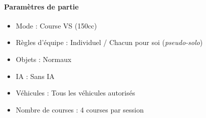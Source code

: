\documentclass[11pt,a4paper]{article}
\begin{document}
    \paragraph{Paramètres de partie}
    \begin{itemize}
        \item Mode : Course VS (150cc)
        \item Règles d'équipe : Individuel / Chacun pour soi (\textit{pseudo-solo})
        \item Objets : Normaux
        \item IA : Sans IA
        \item Véhicules : Tous les véhicules autorisés
        \item Nombre de courses : 4 courses par session
    \end{itemize}
\end{document}
